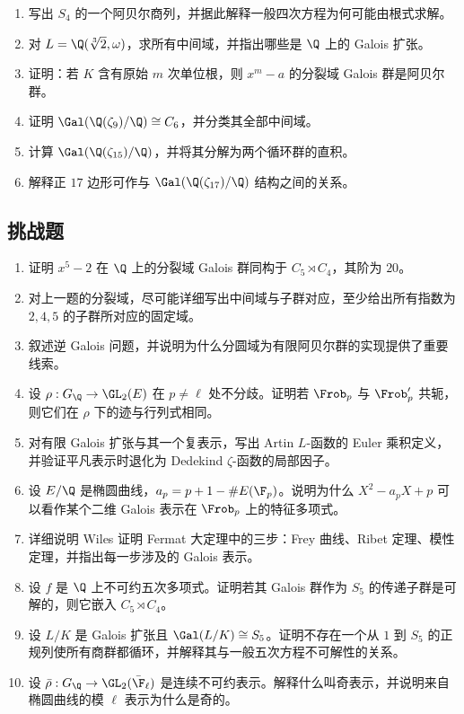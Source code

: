 \begin{enumerate}[resume, label=\textbf{习题12.\arabic*.}, leftmargin=*, itemsep=0.75em]
\item \medium 写出 $S_4$ 的一个阿贝尔商列，并据此解释一般四次方程为何可能由根式求解。
\item \medium 对 $L=\Q(\sqrt[3]{2},\omega)$，求所有中间域，并指出哪些是 $\Q$ 上的 Galois 扩张。
\item \medium 证明：若 $K$ 含有原始 $m$ 次单位根，则 $x^m-a$ 的分裂域 Galois 群是阿贝尔群。
\item \medium 证明 $\Gal(\Q(\zeta_9)/\Q)\cong C_6$，并分类其全部中间域。
\item \medium 计算 $\Gal(\Q(\zeta_{15})/\Q)$，并将其分解为两个循环群的直积。
\item \medium 解释正 $17$ 边形可作与 $\Gal(\Q(\zeta_{17})/\Q)$ 结构之间的关系。
\end{enumerate}

\subsection*{挑战题}

\begin{enumerate}[resume, label=\textbf{习题12.\arabic*.}, leftmargin=*, itemsep=0.75em]
\item \hard 证明 $x^5-2$ 在 $\Q$ 上的分裂域 Galois 群同构于 $C_5\rtimes C_4$，其阶为 $20$。
\item \hard 对上一题的分裂域，尽可能详细写出中间域与子群对应，至少给出所有指数为 $2,4,5$ 的子群所对应的固定域。
\item \hard 叙述逆 Galois 问题，并说明为什么分圆域为有限阿贝尔群的实现提供了重要线索。
\item \hard 设 $\rho:G_{\Q}\to\GL_2(E)$ 在 $p\neq\ell$ 处不分歧。证明若 $\Frob_p$ 与 $\Frob_p'$ 共轭，则它们在 $\rho$ 下的迹与行列式相同。
\item \hard 对有限 Galois 扩张与其一个复表示，写出 Artin $L$-函数的 Euler 乘积定义，并验证平凡表示时退化为 Dedekind $\zeta$-函数的局部因子。
\item \hard 设 $E/\Q$ 是椭圆曲线，$a_p=p+1-\#E(\F_p)$。说明为什么 $X^2-a_pX+p$ 可以看作某个二维 Galois 表示在 $\Frob_p$ 上的特征多项式。
\item \hard 详细说明 Wiles 证明 Fermat 大定理中的三步：Frey 曲线、Ribet 定理、模性定理，并指出每一步涉及的 Galois 表示。
\item \hard 设 $f$ 是 $\Q$ 上不可约五次多项式。证明若其 Galois 群作为 $S_5$ 的传递子群是可解的，则它嵌入 $C_5\rtimes C_4$。
\item \hard 设 $L/K$ 是 Galois 扩张且 $\Gal(L/K)\cong S_5$。证明不存在一个从 $1$ 到 $S_5$ 的正规列使所有商群都循环，并解释其与一般五次方程不可解性的关系。
\item \hard 设 $\bar\rho:G_{\Q}\to\GL_2(\bar{\F}_{\ell})$ 是连续不可约表示。解释什么叫奇表示，并说明来自椭圆曲线的模 $\ell$ 表示为什么是奇的。
\end{enumerate}

